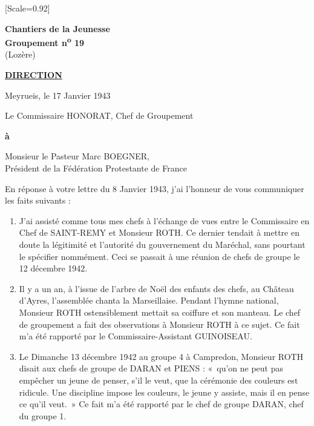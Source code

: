 \newpage
\papierquadrille
{[Scale=0.92]
\small

\thispagestyle{empty}

\begin{center}
\textbf{\large Chantiers de la Jeunesse}\\
\textbf{Groupement n\textsuperscript{o} 19}\\
(Lozère)
\end{center}

\noindent\textbf{\underline{DIRECTION}}

\begin{flushright}
Meyrueis, le 17 Janvier 1943
\end{flushright}

\noindent
Le Commissaire HONORAT, Chef de Groupement

\vspace{1em}

\noindent
\textbf{à}

\begin{center}
Monsieur le Pasteur Marc BOEGNER,\\
Président de la Fédération Protestante de France
\end{center}

\vspace{1em}

En réponse à votre lettre du 8 Janvier 1943, j’ai l’honneur de vous communiquer les faits suivants :

\begin{enumerate}
\item
J’ai assisté comme tous mes chefs à l’échange de vues
entre le Commissaire en Chef de SAINT-REMY et Monsieur ROTH. Ce dernier
tendait à mettre en doute la légitimité et l’autorité du gouvernement
du Maréchal, sans pourtant le spécifier nommément. Ceci se
passait à une réunion de chefs de groupe le 12 décembre 1942.

\item
Il y a un an, à l’issue de l’arbre de Noël des enfants
des chefs, au Château d’Ayres, l’assemblée chanta la Marseillaise.
Pendant l’hymne national, Monsieur ROTH ostensiblement mettait sa
coiffure et son manteau. Le chef de groupement a fait des observations
à Monsieur ROTH à ce sujet. Ce fait m’a été rapporté par le Commissaire-Assistant GUINOISEAU.

\item
Le Dimanche 13 décembre 1942 au groupe 4 à Campredon,
Monsieur ROTH disait aux chefs de groupe de DARAN et PIENS : «~qu'on ne
peut pas empêcher un jeune de penser, s’il le veut, que la cérémonie
des couleurs est ridicule. Une discipline impose les couleurs, le
jeune y assiste, mais il en pense ce qu’il veut.~» Ce fait m’a été
rapporté par le chef de groupe DARAN, chef du groupe 1.


\end{enumerate}}
